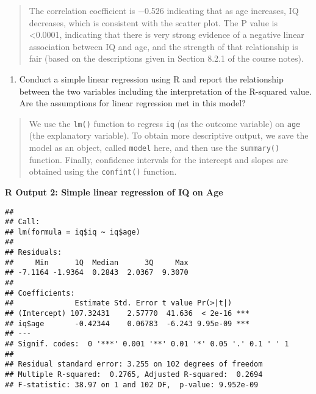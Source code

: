 \documentclass[
]{memoir}
\newenvironment{Shaded}{\begin{snugshade}}{\end{snugshade}}
\newcommand{\FunctionTok}[1]{\textcolor[rgb]{0.00,0.00,0.00}{#1}}
\newcommand{\NormalTok}[1]{#1}
\newcommand{\OtherTok}[1]{\textcolor[rgb]{0.56,0.35,0.01}{#1}}
\newcommand{\SpecialCharTok}[1]{\textcolor[rgb]{0.00,0.00,0.00}{#1}}
\providecommand{\tightlist}{%
  \setlength{\itemsep}{0pt}\setlength{\parskip}{0pt}}
\begin{document}
\begin{quote}
The correlation coefficient is −0.526 indicating that as age increases, IQ decreases, which is consistent with the scatter plot. The P value is \textless0.0001, indicating that there is very strong evidence of a negative linear association between IQ and age, and the strength of that relationship is fair (based on the descriptions given in Section 8.2.1 of the course notes).
\end{quote}

\begin{enumerate}
\def\labelenumi{\alph{enumi})}
\setcounter{enumi}{3}
\tightlist
\item
  Conduct a simple linear regression using R and report the relationship between the two variables including the interpretation of the R-squared value. Are the assumptions for linear regression met in this model?
\end{enumerate}

\begin{quote}
We use the \texttt{lm()} function to regress \texttt{iq} (as the outcome variable) on \texttt{age} (the explanatory variable). To obtain more descriptive output, we save the model as an object, called \texttt{model} here, and then use the \texttt{summary()} function. Finally, confidence intervals for the intercept and slopes are obtained using the \texttt{confint()} function.
\end{quote}

\textbf{R Output 2: Simple linear regression of IQ on Age}

\begin{Shaded}
\end{Shaded}

\begin{verbatim}
## 
## Call:
## lm(formula = iq$iq ~ iq$age)
## 
## Residuals:
##     Min      1Q  Median      3Q     Max 
## -7.1164 -1.9364  0.2843  2.0367  9.3070 
## 
## Coefficients:
##              Estimate Std. Error t value Pr(>|t|)    
## (Intercept) 107.32431    2.57770  41.636  < 2e-16 ***
## iq$age       -0.42344    0.06783  -6.243 9.95e-09 ***
## ---
## Signif. codes:  0 '***' 0.001 '**' 0.01 '*' 0.05 '.' 0.1 ' ' 1
## 
## Residual standard error: 3.255 on 102 degrees of freedom
## Multiple R-squared:  0.2765, Adjusted R-squared:  0.2694 
## F-statistic: 38.97 on 1 and 102 DF,  p-value: 9.952e-09
\end{verbatim}
\end{document}
